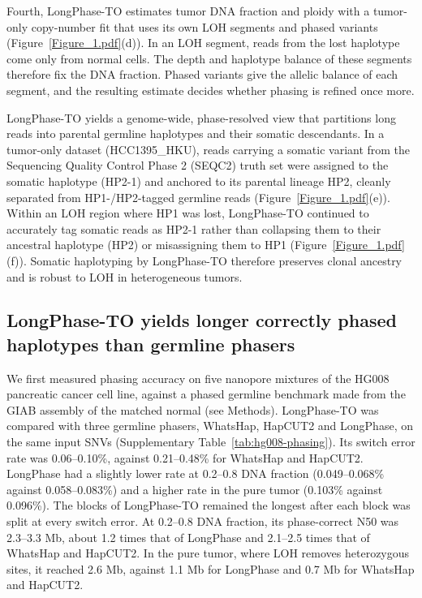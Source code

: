 \documentclass[unnumsec,webpdf,contemporary,large]{oup-authoring-template}
\begin{document}
Fourth, LongPhase-TO estimates tumor DNA fraction and ploidy with a tumor-only copy-number fit that uses its own LOH segments and phased variants (Figure~\ref{Figure_1.pdf}(d)). In an LOH segment, reads from the lost haplotype come only from normal cells. The depth and haplotype balance of these segments therefore fix the DNA fraction. Phased variants give the allelic balance of each segment, and the resulting estimate decides whether phasing is refined once more.

LongPhase-TO yields a genome-wide, phase-resolved view that partitions long reads into parental germline haplotypes and their somatic descendants. In a tumor-only dataset (HCC1395\_HKU), reads carrying a somatic variant from the Sequencing Quality Control Phase 2 (SEQC2) truth set were assigned to the somatic haplotype (HP2-1) and anchored to its parental lineage HP2, cleanly separated from HP1-/HP2-tagged germline reads (Figure~\ref{Figure_1.pdf}(e)). Within an LOH region where HP1 was lost, LongPhase-TO continued to accurately tag somatic reads as HP2-1 rather than collapsing them to their ancestral haplotype (HP2) or misassigning them to HP1 (Figure~\ref{Figure_1.pdf}(f)). Somatic haplotyping by LongPhase-TO therefore preserves clonal ancestry and is robust to LOH in heterogeneous tumors.

\subsection{LongPhase-TO yields longer correctly phased haplotypes than germline phasers}
We first measured phasing accuracy on five nanopore mixtures of the HG008 pancreatic cancer cell line, against a phased germline benchmark made from the GIAB assembly of the matched normal (see Methods). LongPhase-TO was compared with three germline phasers, WhatsHap, HapCUT2 and LongPhase, on the same input SNVs (Supplementary Table~\ref{tab:hg008-phasing}). Its switch error rate was 0.06--0.10\%, against 0.21--0.48\% for WhatsHap and HapCUT2. LongPhase had a slightly lower rate at 0.2--0.8 DNA fraction (0.049--0.068\% against 0.058--0.083\%) and a higher rate in the pure tumor (0.103\% against 0.096\%). The blocks of LongPhase-TO remained the longest after each block was split at every switch error. At 0.2--0.8 DNA fraction, its phase-correct N50 was 2.3--3.3 Mb, about 1.2 times that of LongPhase and 2.1--2.5 times that of WhatsHap and HapCUT2. In the pure tumor, where LOH removes heterozygous sites, it reached 2.6 Mb, against 1.1 Mb for LongPhase and 0.7 Mb for WhatsHap and HapCUT2.
\end{document}
